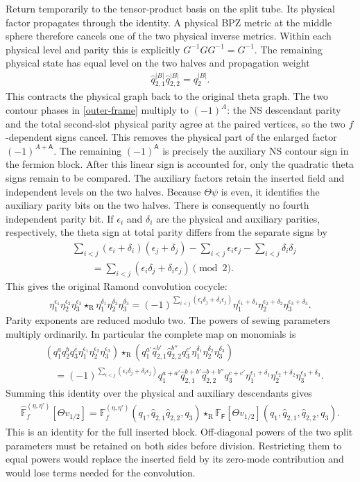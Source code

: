 \documentclass[12pt]{article}
\newcommand{\ie}{\begin{equation}\begin{aligned}}
\newcommand{\fe}{\end{aligned}\end{equation}}
\newcommand{\R}{\mathrm{R}}
\numberwithin{equation}{section}
\begin{document}
Return temporarily to the tensor-product basis on the split tube.  Its
physical factor propagates through the identity.  A physical BPZ metric
at the middle sphere therefore cancels one of the two physical inverse
metrics.  Within each physical level and parity this is explicitly
$G^{-1}GG^{-1}=G^{-1}$.  The remaining physical state has equal level on
the two halves and propagation weight
\ie
 \hat q_{2,1}^{|B|}\hat q_{2,2}^{|B|}
 =q_2^{|B|}.
\fe
This contracts the physical graph back to the original theta graph.
The two contour phases in \eqref{outer-frame} multiply to $(-1)^A$:
the NS descendant parity and the total second-slot physical parity agree
at the paired vertices, so the two $f$-dependent signs cancel.  This
removes the physical part of the enlarged factor $(-1)^{A+\mathsf A}$.
The remaining $(-1)^{\mathsf A}$ is precisely the auxiliary NS contour
sign in the fermion block.  After this linear sign is accounted for,
only the quadratic theta signs remain to be compared.
The auxiliary factors retain the inserted field and independent levels
on the two halves.  Because $\Theta\psi$ is even, it identifies the
auxiliary parity bits on the two halves.  There is consequently no
fourth independent parity bit.  If $\epsilon_i$ and $\delta_i$ are the
physical and auxiliary parities, respectively, the theta sign at total
parity differs from the separate signs by
\ie
 &\sum_{i<j}(\epsilon_i+\delta_i)(\epsilon_j+\delta_j)
 -\sum_{i<j}\epsilon_i\epsilon_j-\sum_{i<j}\delta_i\delta_j\\
 &\qquad=\sum_{i<j}(\epsilon_i\delta_j+\delta_i\epsilon_j)
 \pmod2.
\fe
This gives the original Ramond convolution cocycle:
\ie
 \eta_1^{\epsilon_1}\eta_2^{\epsilon_2}\eta_3^{\epsilon_3}
 \star_{\R}\eta_1^{\delta_1}\eta_2^{\delta_2}\eta_3^{\delta_3}
 =(-1)^{\sum_{i<j}(\epsilon_i\delta_j+\delta_i\epsilon_j)}
 \eta_1^{\epsilon_1+\delta_1}\eta_2^{\epsilon_2+\delta_2}
 \eta_3^{\epsilon_3+\delta_3}.
 \label{cocycle}
\fe
Parity exponents are reduced modulo two.  The powers of sewing
parameters multiply ordinarily.  In particular the complete map on
monomials is
\begin{align}
 &(q_1^a q_2^b q_3^c\eta_1^{\epsilon_1}
       \eta_2^{\epsilon_2}\eta_3^{\epsilon_3})
 \star_{\R}
 (q_1^{a'}\hat q_{2,1}^{b'}\hat q_{2,2}^{b''}q_3^{c'}
       \eta_1^{\delta_1}\eta_2^{\delta_2}\eta_3^{\delta_3})
 \nonumber\\
 &\quad=(-1)^{\sum_{i<j}(\epsilon_i\delta_j+\delta_i\epsilon_j)}
 q_1^{a+a'}\hat q_{2,1}^{b+b'}\hat q_{2,2}^{b+b''}q_3^{c+c'}
 \eta_1^{\epsilon_1+\delta_1}\eta_2^{\epsilon_2+\delta_2}
 \eta_3^{\epsilon_3+\delta_3}.
 \label{coefficient-map}
\end{align}
Summing this identity over the physical and auxiliary descendants gives
\ie
 \widehat{\mathbb F}_f^{(\eta,\eta')}[\Theta v_{1/2}]
 =\mathbb F_f^{(\eta,\eta')}(q_1,\hat q_{2,1}\hat q_{2,2},q_3)
 \star_{\R}\mathbb F_{\mathsf F}[\Theta v_{1/2}]
 (q_1,\hat q_{2,1},\hat q_{2,2},q_3).
 \label{full-convolution}
\fe
This is an identity for the full inserted block.  Off-diagonal powers
of the two split parameters must be retained on both sides before
division.  Restricting them to equal powers would replace the inserted
field by its zero-mode contribution and would lose terms needed for
the convolution.
\end{document}
